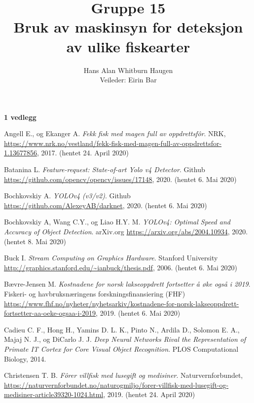 \documentclass[11ot]{article}
\title{Gruppe 15\\Bruk av maskinsyn for deteksjon av ulike fiskearter}
\author{Hans Alan Whitburn Haugen\\Veileder: Eirin Bar}
\begin{document}

\newpage

\newpage

\newpage

\newpage

\tableofcontents
\textbf{1 vedlegg}
\clearpage
{}
\setcounter{page}{1}








\begin{thebibliography}{9}

Angell E., og Ekanger A. 
\textit{Fekk fisk med magen full av oppdrettsfôr}. 
NRK, \url{https://www.nrk.no/vestland/fekk-fisk-med-magen-full-av-oppdrettsfor-1.13677856}, 2017. (hentet 24. April 2020)

Batanina L.
\textit{Feature-request: State-of-art Yolo v4 Detector}. 
Github \url{https://github.com/opencv/opencv/issues/17148}, 2020. (hentet 6. Mai 2020)

Bochkovskiy A.
\textit{YOLOv4 (v3/v2)}. 
Github \url{https://github.com/AlexeyAB/darknet}, 2020. (hentet 6. Mai 2020)

Bochkovskiy A, Wang C.Y., og Liao H.Y. M.
\textit{YOLOv4: Optimal Speed and Accuracy of Object Detection}. 
arXiv.org \url{https://arxiv.org/abs/2004.10934}, 2020. (hentet 8. Mai 2020)

Buck I.
\textit{Stream Computing on Graphics Hardware}. 
Stanford University \url{http://graphics.stanford.edu/~ianbuck/thesis.pdf}, 2006. (hentet 6. Mai 2020)

Bævre-Jensen M.
\textit{Kostnadene for norsk lakseoppdrett fortsetter å øke også i 2019}. 
Fiskeri- og havbruksnæringens forskningsfinansiering (FHF) \url{https://www.fhf.no/nyheter/nyhetsarkiv/kostnadene-for-norsk-lakseoppdrett-fortsetter-aa-oeke-ogsaa-i-2019}, 2019. (hentet 6. Mai 2020)

Cadieu C. F., Hong H., Yamins D. L. K., Pinto N., Ardila D., Solomon E. A., Majaj N. J., og DiCarlo J. J. 
\textit{Deep Neural Networks Rival the Representation of Primate IT Cortex for Core Visual Object Recognition}. 
PLOS Computational Biology, 2014.

Christensen T. B. 
\textit{Fôrer villfisk med lusegift og medisiner}. 
Naturvernforbundet, \url{https://naturvernforbundet.no/naturogmiljo/forer-villfisk-med-lusegift-og-medisiner-article39320-1024.html}, 2019. (hentet 24. April 2020)


\end{thebibliography}
\end{document}
